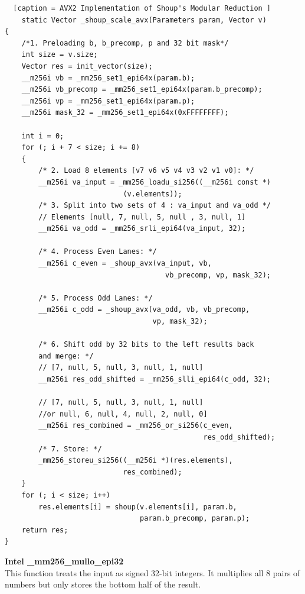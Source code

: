 \documentclass{article}
\begin{document}
\begin{lstlisting}  [caption = AVX2 Implementation of Shoup's Modular Reduction ]
    static Vector _shoup_scale_avx(Parameters param, Vector v)
{
    /*1. Preloading b, b_precomp, p and 32 bit mask*/
    int size = v.size;
    Vector res = init_vector(size);
    __m256i vb = _mm256_set1_epi64x(param.b);
    __m256i vb_precomp = _mm256_set1_epi64x(param.b_precomp);
    __m256i vp = _mm256_set1_epi64x(param.p);
    __m256i mask_32 = _mm256_set1_epi64x(0xFFFFFFFF);

    int i = 0;
    for (; i + 7 < size; i += 8)
    {
        /* 2. Load 8 elements [v7 v6 v5 v4 v3 v2 v1 v0]: */
        __m256i va_input = _mm256_loadu_si256((__m256i const *)
                            (v.elements));
        /* 3. Split into two sets of 4 : va_input and va_odd */
        // Elements [null, 7, null, 5, null , 3, null, 1]
        __m256i va_odd = _mm256_srli_epi64(va_input, 32); 
        
        /* 4. Process Even Lanes: */
        __m256i c_even = _shoup_avx(va_input, vb, 
                                      vb_precomp, vp, mask_32);
       
        /* 5. Process Odd Lanes: */
        __m256i c_odd = _shoup_avx(va_odd, vb, vb_precomp,
                                   vp, mask_32);
        
        /* 6. Shift odd by 32 bits to the left results back 
        and merge: */
        // [7, null, 5, null, 3, null, 1, null]
        __m256i res_odd_shifted = _mm256_slli_epi64(c_odd, 32); 
        
        // [7, null, 5, null, 3, null, 1, null] 
        //or null, 6, null, 4, null, 2, null, 0]
        __m256i res_combined = _mm256_or_si256(c_even, 
                                               res_odd_shifted); 
        /* 7. Store: */
        _mm256_storeu_si256((__m256i *)(res.elements), 
                            res_combined);
    }
    for (; i < size; i++)
        res.elements[i] = shoup(v.elements[i], param.b, 
                                param.b_precomp, param.p);
    return res;
}
\end{lstlisting}
\pagebreak
\textbf{Intel \_mm256\_mullo\_epi32}\\
This function treats the input as signed 32-bit integers. It multiplies all 8 pairs of numbers but only stores the bottom half of the result.
\end{document}
